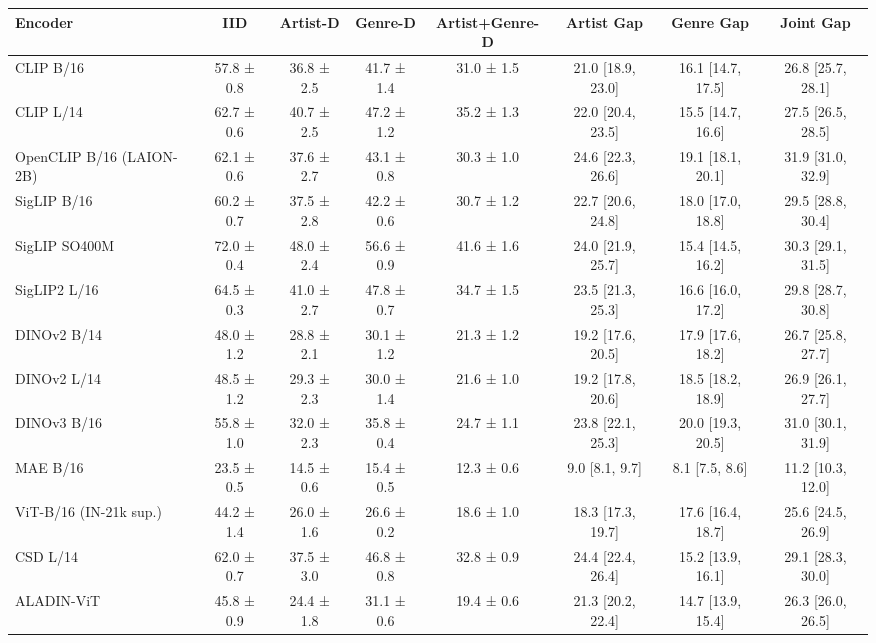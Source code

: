 \begin{tabular}{lccccccc}
\toprule
Encoder & IID & Artist-D & Genre-D & Artist+Genre-D & Artist Gap & Genre Gap & Joint Gap \\
\midrule
CLIP B/16 & 57.8 ± 0.8 & 36.8 ± 2.5 & 41.7 ± 1.4 & 31.0 ± 1.5 & 21.0 [18.9, 23.0] & 16.1 [14.7, 17.5] & 26.8 [25.7, 28.1] \\
CLIP L/14 & 62.7 ± 0.6 & 40.7 ± 2.5 & 47.2 ± 1.2 & 35.2 ± 1.3 & 22.0 [20.4, 23.5] & 15.5 [14.7, 16.6] & 27.5 [26.5, 28.5] \\
OpenCLIP B/16 (LAION-2B) & 62.1 ± 0.6 & 37.6 ± 2.7 & 43.1 ± 0.8 & 30.3 ± 1.0 & 24.6 [22.3, 26.6] & 19.1 [18.1, 20.1] & 31.9 [31.0, 32.9] \\
SigLIP B/16 & 60.2 ± 0.7 & 37.5 ± 2.8 & 42.2 ± 0.6 & 30.7 ± 1.2 & 22.7 [20.6, 24.8] & 18.0 [17.0, 18.8] & 29.5 [28.8, 30.4] \\
SigLIP SO400M & 72.0 ± 0.4 & 48.0 ± 2.4 & 56.6 ± 0.9 & 41.6 ± 1.6 & 24.0 [21.9, 25.7] & 15.4 [14.5, 16.2] & 30.3 [29.1, 31.5] \\
SigLIP2 L/16 & 64.5 ± 0.3 & 41.0 ± 2.7 & 47.8 ± 0.7 & 34.7 ± 1.5 & 23.5 [21.3, 25.3] & 16.6 [16.0, 17.2] & 29.8 [28.7, 30.8] \\
DINOv2 B/14 & 48.0 ± 1.2 & 28.8 ± 2.1 & 30.1 ± 1.2 & 21.3 ± 1.2 & 19.2 [17.6, 20.5] & 17.9 [17.6, 18.2] & 26.7 [25.8, 27.7] \\
DINOv2 L/14 & 48.5 ± 1.2 & 29.3 ± 2.3 & 30.0 ± 1.4 & 21.6 ± 1.0 & 19.2 [17.8, 20.6] & 18.5 [18.2, 18.9] & 26.9 [26.1, 27.7] \\
DINOv3 B/16 & 55.8 ± 1.0 & 32.0 ± 2.3 & 35.8 ± 0.4 & 24.7 ± 1.1 & 23.8 [22.1, 25.3] & 20.0 [19.3, 20.5] & 31.0 [30.1, 31.9] \\
MAE B/16 & 23.5 ± 0.5 & 14.5 ± 0.6 & 15.4 ± 0.5 & 12.3 ± 0.6 & 9.0 [8.1, 9.7] & 8.1 [7.5, 8.6] & 11.2 [10.3, 12.0] \\
ViT-B/16 (IN-21k sup.) & 44.2 ± 1.4 & 26.0 ± 1.6 & 26.6 ± 0.2 & 18.6 ± 1.0 & 18.3 [17.3, 19.7] & 17.6 [16.4, 18.7] & 25.6 [24.5, 26.9] \\
CSD L/14 & 62.0 ± 0.7 & 37.5 ± 3.0 & 46.8 ± 0.8 & 32.8 ± 0.9 & 24.4 [22.4, 26.4] & 15.2 [13.9, 16.1] & 29.1 [28.3, 30.0] \\
ALADIN-ViT & 45.8 ± 0.9 & 24.4 ± 1.8 & 31.1 ± 0.6 & 19.4 ± 0.6 & 21.3 [20.2, 22.4] & 14.7 [13.9, 15.4] & 26.3 [26.0, 26.5] \\
\bottomrule
\end{tabular}
